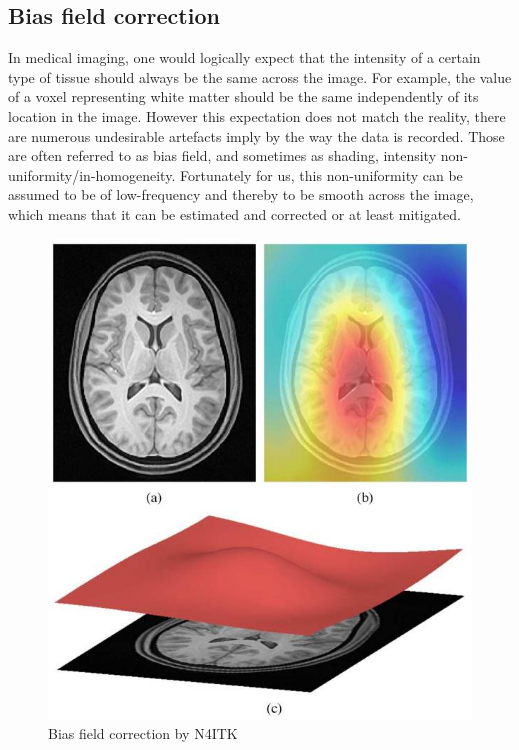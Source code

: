 \subsection{Bias field correction}
In medical imaging, one would logically expect that the intensity of a certain type of tissue should always be the same across the image. For example, the value of a voxel representing white matter should be the same independently of its location in the image. However this expectation does not match the reality, there are numerous undesirable artefacts imply by the way the data is recorded. Those are often referred to as bias field, and sometimes as shading, intensity non-uniformity/in-homogeneity.  Fortunately for us, this non-uniformity can be assumed to be of low-frequency and thereby to be smooth across the image, which means that it can be estimated and corrected or at least mitigated.
\begin{figure}
 \centering
 \includegraphics[width=.9\linewidth]{figures/preprocessing/N4_explain.jpeg}
 \captionsetup{width=.9\linewidth}
 \caption[N4]{Bias field correction by N4ITK\footnotemark}
 \label{fig:N4_explain}
\end{figure}


